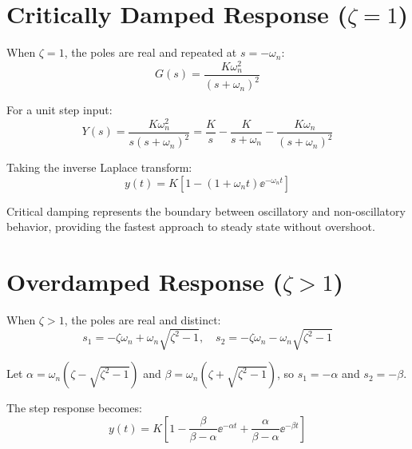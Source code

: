 \section{Critically Damped Response ($\zeta = 1$)}
\label{sec:critically_damped}

When $\zeta = 1$, the poles are real and repeated at $s = -\omega_n$:
\begin{equation}
G(s) = \frac{K\omega_n^2}{(s + \omega_n)^2}
\end{equation}

For a unit step input:
\begin{equation}
Y(s) = \frac{K\omega_n^2}{s(s + \omega_n)^2} = \frac{K}{s} - \frac{K}{s + \omega_n} - \frac{K\omega_n}{(s + \omega_n)^2}
\end{equation}

Taking the inverse Laplace transform:
\begin{equation}
\boxed{y(t) = K\left[1 - (1 + \omega_n t)\ee^{-\omega_n t}\right]}
\label{eq:critical_step}
\end{equation}

Critical damping represents the boundary between oscillatory and non-oscillatory behavior, providing the fastest approach to steady state without overshoot.

\section{Overdamped Response ($\zeta > 1$)}
\label{sec:overdamped}

When $\zeta > 1$, the poles are real and distinct:
\begin{equation}
s_1 = -\zeta\omega_n + \omega_n\sqrt{\zeta^2 - 1}, \quad s_2 = -\zeta\omega_n - \omega_n\sqrt{\zeta^2 - 1}
\end{equation}

Let $\alpha = \omega_n(\zeta - \sqrt{\zeta^2 - 1})$ and $\beta = \omega_n(\zeta + \sqrt{\zeta^2 - 1})$, so $s_1 = -\alpha$ and $s_2 = -\beta$.

The step response becomes:
\begin{equation}
\boxed{y(t) = K\left[1 - \frac{\beta}{\beta - \alpha}\ee^{-\alpha t} + \frac{\alpha}{\beta - \alpha}\ee^{-\beta t}\right]}
\label{eq:overdamped_step}
\end{equation}

